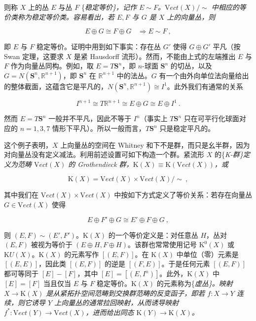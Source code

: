 \documentclass[11pt,a4paper]{ctexart}
\begin{document}
则称 \(X\) 上的丛 \(E\) 与丛 \(F\) \{\it 稳定等价\}，记作 \(E\sim F\)。\({\mathrm Vect}(X)/\sim\) 中相应的等价类称为稳定等价类。容易看出，若 \(E,F\) 与 \(G\) 是 \(X\) 上的向量丛，则

\[E\oplus G\cong F\oplus G ~~~~\Rightarrow E\sim F\ ,\]

即 \(E\) 与 \(F\) 稳定等价。证明中用到如下事实：存在丛 \(G'\) 使得 \(G\oplus G'\) 平凡（按 Swan 定理，这要求 \(X\) 是紧 Hausdorff 流形）。然而，不能由上式的左端推出 \(E\) 与 \(F\) 作为向量丛同构。例如，取 \(E=T{\mathbf S}^n\)，即 \(n\)-球面 \({\mathbf S}^n\) 的切丛，以及 \(G=N({\mathbf S}^n,{\mathbb{R}}^{n+1})\)，即 \({\mathbf S}^n\) 在 \({\mathbb{R}}^{n+1}\) 中的法丛。\(G\) 有一个由外向单位法向量给出的整体截面，这蕴含它是平凡的，\(N({\mathbf S}^n,{\mathbb{R}}^{n+1})\cong I^1\)。此外我们有通常的关系

\[I^{n+1}\cong T{\mathbb{R}}^{n+1}\cong E\oplus G\cong E\oplus I^1\ .\]

然而 \(E=T{\mathbf S}^n\) 一般并不平凡，因此不等于 \(I^n\)（事实上 \(T{\mathbf S}^n\) 只在可平行化球面对应的 \(n=1,3,7\) 情形下平凡）。所以一般而言，\(T{\mathbf S}^n\) 只是稳定平凡的。

这个例子表明，\(X\) 上向量丛的空间在 Whitney 和下不是群，而只是幺半群，因为对向量丛没有定义减法。利用前述设置可如下构造一个群。紧流形 \(X\) 的\{\it K-群\}定义为范畴 \({\mathrm Vect}(X)\) 的 Grothendieck 群，\({\mathrm K}(X)\equiv {\mathrm K}({\mathrm Vect}(X))\)，或

\[{\mathrm K}(X)={\mathrm Vect}(X)\times {\mathrm Vect}(X)/\sim\ ,\]

其中我们在 \({\mathrm Vect}(X)\times {\mathrm Vect}(X)\) 中按如下方式定义了等价关系：若存在向量丛 \(G\in {\mathrm Vect}(X)\) 使得

\[E\oplus F' \oplus G \cong E' \oplus F \oplus G\ ,\]

则 \((E,F)\sim (E',F')\)。\({\mathrm K}(X)\) 的一个等价定义是：对任意丛 \(H\)，丛对 \((E,F)\) 被视为等价于 \((E\oplus H,F\oplus H)\)。该群也常常使用记号 \({\mathrm K}^0(X)\) 或 \({\mathrm KU}(X)\)。\({\mathrm K}(X)\) 的元素写作 \([(E,F)]\)。在 \({\mathrm K}(X)\) 中单位（零）元素是 \([(E,E)]\)，因此类 \([(E,F)]\) 的逆是 \([(F,E)]\)。于是任何元素 \([(E,F)]\) 都可等同于 \([E]-[F]\)，其中 \([E]=[(E,I^n)]\)。此外，\({\mathrm K}(X)\) 中 \([E]=[F]\) 当且仅当 \(E\) 与 \(F\) 稳定等价。\({\mathrm K}(X)\) 的元素称为\{\it 虚丛\}。映射 \(X\rightarrow {\mathrm K}(X)\) 是从紧拓扑空间范畴到交换群范畴的反变函子，即若 \(f:X\rightarrow Y\) 连续，则它诱导 \(Y\) 上向量丛的通常拉回映射，从而诱导映射 \(f^*:{\mathrm Vect}(Y)\rightarrow {\mathrm Vect}(X)\)，进而给出同态 \({\mathrm K}(Y)\rightarrow{\mathrm K}(X)\)。
\end{document}
